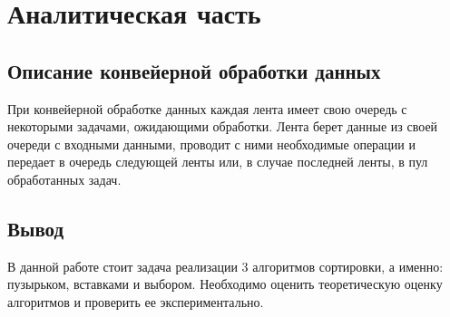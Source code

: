 \chapter{Аналитическая часть}

\section{Описание конвейерной обработки данных}

При конвейерной обработке данных каждая лента имеет свою очередь с некоторыми задачами, ожидающими обработки. Лента берет данные из своей очереди с входными данными, проводит с ними необходимые операции и передает в очередь следующей ленты или, в случае последней ленты, в пул обработанных задач.

\section*{Вывод}
В данной работе стоит задача реализации 3 алгоритмов сортировки, а именно: пузырьком, вставками и выбором.
Необходимо оценить теоретическую оценку алгоритмов и проверить ее экспериментально.
